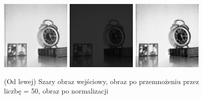 \documentclass[final,a4paper,openany,12pt]{mwbk}
\begin{document}
\begin{figure}[H]
	\begin{center}
		\includegraphics[width=0.3\textwidth]{1/1Gray_Const_Multipl_Original}
		\includegraphics[width=0.3\textwidth]{1/1Gray_Const_Multipl_Result}
		\includegraphics[width=0.3\textwidth]{1/1Gray_Const_Multipl_Result_Norm}
	\end{center}
	\caption{(Od lewej) Szary obraz wejściowy, obraz po przemnożeniu przez liczbę = 50, obraz po normalizacji }
\end{figure}
\end{document}
